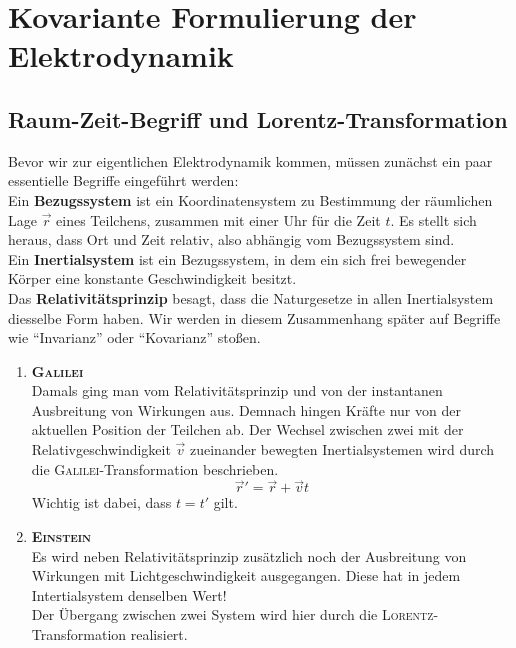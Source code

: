 \chapter[Kovariante Formulierung]{Kovariante Formulierung der Elektrodynamik}

\section{Raum-Zeit-Begriff und Lorentz-Transformation}

Bevor wir zur eigentlichen Elektrodynamik kommen, müssen zunächst ein paar essentielle Begriffe eingeführt werden:\\

Ein \textbf{Bezugssystem} ist ein Koordinatensystem zu Bestimmung der räumlichen Lage $\vec{r}$ eines Teilchens, zusammen mit einer Uhr für die Zeit $t$. Es stellt sich heraus, dass Ort und Zeit relativ, also abhängig vom Bezugssystem sind.\\

Ein \textbf{Inertialsystem} ist ein Bezugssystem, in dem ein sich frei bewegender Körper eine konstante Geschwindigkeit besitzt.\\

Das \textbf{Relativitätsprinzip} besagt, dass die Naturgesetze in allen Inertialsystem diesselbe Form haben. Wir werden in diesem Zusammenhang später auf Begriffe wie "`Invarianz"' oder "`Kovarianz"' stoßen.\\ 

\begin{enumerate}
\item \textbf{\textsc{ Galilei}}\\

Damals ging man vom Relativitätsprinzip und von der instantanen Ausbreitung von Wirkungen aus. Demnach hingen Kräfte nur von der aktuellen Position der Teilchen ab.
\newpage
Der Wechsel zwischen zwei mit der Relativgeschwindigkeit $\vec{v}$ zueinander bewegten Inertialsystemen wird durch die \textsc{Galilei}-Transformation beschrieben. 
\begin{equation*}
\vec{r}'=\vec{r}+\vec{v}t
\end{equation*}
Wichtig ist dabei, dass $t=t'$ gilt.\\

\item \textbf{\textsc{ Einstein}}\\

Es wird neben Relativitätsprinzip zusätzlich noch der Ausbreitung von Wirkungen mit Lichtgeschwindigkeit ausgegangen. Diese hat in jedem Intertialsystem denselben Wert! \\
Der Übergang zwischen zwei System wird hier durch die \textsc{Lorentz}-Transformation realisiert.\\ 
\end{enumerate}

